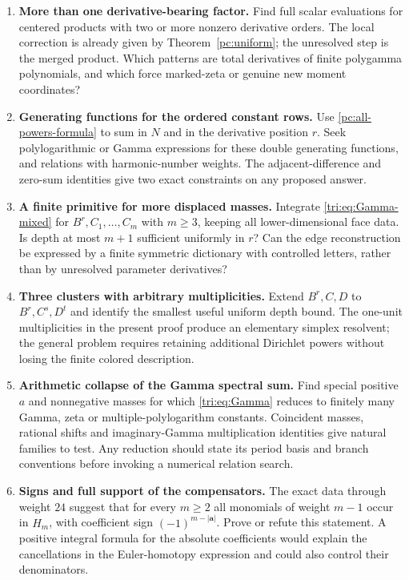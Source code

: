\documentclass[11pt,a4paper]{article}
\theoremstyle{definition}
\theoremstyle{remark}
\numberwithin{equation}{section}
\begin{document}
\begin{enumerate}[label=\textbf{Q\arabic*.},leftmargin=*]
\item \textbf{More than one derivative-bearing factor.}
Find full scalar evaluations for centered products with two or more
nonzero derivative orders. The local correction is already given by
Theorem~\ref{pc:uniform}; the unresolved step is the merged product.
Which patterns are total derivatives of finite polygamma polynomials,
and which force marked-zeta or genuine new moment coordinates?

\item \textbf{Generating functions for the ordered constant rows.}
Use \eqref{pc:all-powers-formula} to sum in $N$ and in the derivative
position $r$. Seek polylogarithmic or Gamma expressions for these
double generating functions, and relations with harmonic-number
weights. The adjacent-difference and zero-sum identities give two
exact constraints on any proposed answer.

\item \textbf{A finite primitive for more displaced masses.}
Integrate \eqref{tri:eq:Gamma-mixed} for
$B^r,C_1,\ldots,C_m$ with $m\ge3$, keeping all lower-dimensional
face data. Is depth at most $m+1$ sufficient uniformly in $r$?
Can the edge reconstruction be expressed by a finite symmetric
dictionary with controlled letters, rather than by unresolved
parameter derivatives?

\item \textbf{Three clusters with arbitrary multiplicities.}
Extend $B^r,C,D$ to $B^r,C^s,D^t$ and identify the smallest useful
uniform depth bound. The one-unit multiplicities in the present
proof produce an elementary simplex resolvent; the general problem
requires retaining additional Dirichlet powers without losing the
finite colored description.

\item \textbf{Arithmetic collapse of the Gamma spectral sum.}
Find special positive $a$ and nonnegative masses for which
\eqref{tri:eq:Gamma} reduces to finitely many Gamma, zeta or
multiple-polylogarithm constants. Coincident masses, rational
shifts and imaginary-Gamma multiplication identities give natural
families to test. Any reduction should state its period basis and
branch conventions before invoking a numerical relation search.

\item \textbf{Signs and full support of the compensators.}
The exact data through weight $24$ suggest that for every $m\ge2$
all monomials of weight $m-1$ occur in $H_m$, with coefficient sign
$(-1)^{m-|\boldsymbol a|}$.
Prove or refute this statement. A positive integral formula for the
absolute coefficients would explain the cancellations in the
Euler-homotopy expression and could also control their denominators.


\end{enumerate}
\end{document}
